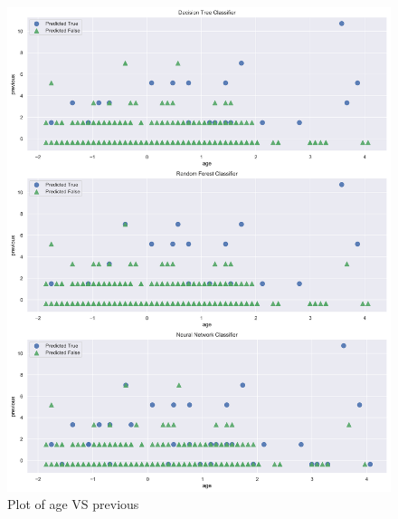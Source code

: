 \clearpage{}
\begin{figure}[!ht]
 \centering
\includegraphics[width=\textwidth,height=\textheight,keepaspectratio]{assignment2/1-4-age and previous features.png}
\caption{\label{fig:2dplot1}Plot of age VS previous }
\end{figure}


